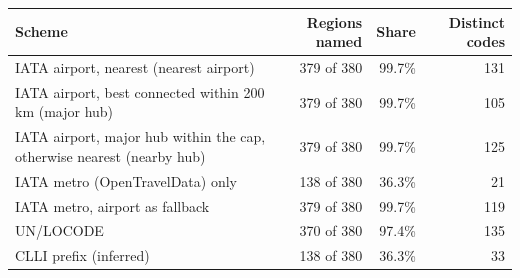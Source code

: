 \begin{tabular}{lrrr}
\toprule
Scheme & Regions named & Share & Distinct codes \\
\midrule
IATA airport, nearest (nearest airport) & 379 of 380 & 99.7\% & 131 \\
IATA airport, best connected within 200 km (major hub) & 379 of 380 & 99.7\% & 105 \\
IATA airport, major hub within the cap, otherwise nearest (nearby hub) & 379 of 380 & 99.7\% & 125 \\
IATA metro (OpenTravelData) only & 138 of 380 & 36.3\% & 21 \\
IATA metro, airport as fallback & 379 of 380 & 99.7\% & 119 \\
UN/LOCODE & 370 of 380 & 97.4\% & 135 \\
CLLI prefix (inferred) & 138 of 380 & 36.3\% & 33 \\
\bottomrule
\end{tabular}
